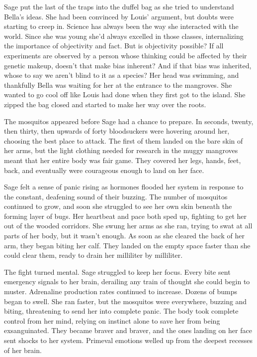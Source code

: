 \documentclass[12pt, fleqn, AofM.tex]{subfiles}
\begin{document}
Sage put the last of the traps into the duffel bag as she tried to understand Bella's ideas. She had been convinced by Louis' argument, but doubts were starting to creep in. Science has always been the way she interacted with the world. Since she was young she'd always excelled in those classes, internalizing the importance of objectivity and fact. But is objectivity possible? If all experiments are observed by a person whose thinking could be affected by their genetic makeup, doesn't that make bias inherent? And if that bias was inherited, whose to say we aren't blind to it as a species? Her head was swimming, and thankfully Bella was waiting for her at the entrance to the mangroves. She wanted to go cool off like Louis had done when they first got to the island. She zipped the bag closed and started to make her way over the roots.

The mosquitos appeared before Sage had a chance to prepare. In seconds, twenty, then thirty, then upwards of forty bloodsuckers were hovering around her, choosing the best place to attack. The first of them landed on the bare skin of her arms, but the light clothing needed for research in the muggy mangroves meant that her entire body was fair game. They covered her legs, hands, feet, back, and eventually were courageous enough to land on her face.

Sage felt a sense of panic rising as hormones flooded her system in response to the constant, deafening sound of their buzzing. The number of mosquitos continued to grow, and soon she struggled to see her own skin beneath the forming layer of bugs. Her heartbeat and pace both sped up, fighting to get her out of the wooded corridors. She swung her arms as she ran, trying to swat at all parts of her body, but it wasn't enough. As soon as she cleared the back of her arm, they began biting her calf. They landed on the empty space faster than she could clear them, ready to drain her milliliter by milliliter. 

The fight turned mental. Sage struggled to keep her focus. Every bite sent emergency signals to her brain, derailing any train of thought she could begin to muster. Adrenaline production rates continued to increase. Dozens of bumps began to swell. She ran faster, but the mosquitos were everywhere, buzzing and biting, threatening to send her into complete panic. The body took complete control from her mind, relying on instinct alone to save her from being exsanguinated. They became braver and braver, and the ones landing on her face sent shocks to her system. Primeval emotions welled up from the deepest recesses of her brain.
\end{document}
